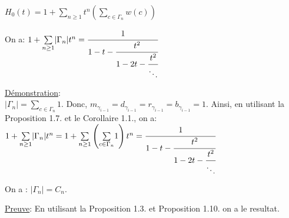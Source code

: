 		\begin{corollaire}
			$H_{0}(t)=1+\underset{n\geq1}{\sum}t^n\left(\underset{c\in \Gamma_{n}}{\sum}w(c)\right)$
		\end{corollaire}

		\begin{proposition}
			On a: $1+\underset{n \geq 1}{\sum}|\Gamma_{n}|t^n = \cfrac{1}{1-t-\cfrac{t^2}{1-2t-\cfrac{t^2}{\ddots}}}$
		\end{proposition}
		\underline{Démonstration}:\\
			$|\Gamma_{n}| = \underset{c\in \Gamma_{n}}{\sum}1 $. Donc, $m_{\gamma_{i-1}}=d_{\gamma_{i-1}}=r_{\gamma_{i-1}}=b_{\gamma_{i-1}}=1$. Ainsi, en utilisant la Proposition 1.7. et le Corollaire 1.1., on a:\\
			$
				1+\underset{n \geq 1}{\sum}|\Gamma_{n}|t^n = 1 + \underset{n \geq 1}{\sum}\left( \underset{c\in \Gamma_{n}}{\sum}1  \right)t^n = \cfrac{1}{1-t-\cfrac{t^2}{1-2t-\cfrac{t^2}{\ddots}}}
			$
		\begin{corollaire}
			On a : $|\Gamma_{n}|=C_{n}$.
		\end{corollaire}
		\underline{Preuve}: En utilisant la Proposition 1.3. et Proposition 1.10. on a le resultat.
			
